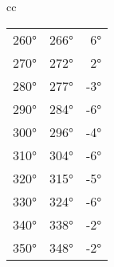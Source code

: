 \begin{tabular}{cc}
\begin{minipage}{0.3\linewidth}
\begin{tabular}{r|rr}
            260° & 266° & 6°  \\
            270° & 272° & 2°  \\
            280° & 277° & -3° \\
            290° & 284° & -6° \\
            300° & 296° & -4° \\
            310° & 304° & -6° \\
            320° & 315° & -5° \\
            330° & 324° & -6° \\
            340° & 338° & -2° \\
            350° & 348° & -2° \\
        \end{tabular}
    \end{minipage}
\end{tabular}
